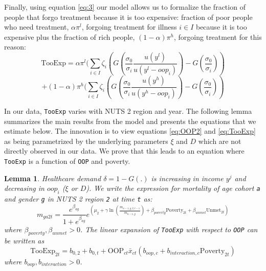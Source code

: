 \documentclass[a4paper,12pt]{article}
\newtheorem{lemma}{Lemma}
\begin{document}
Finally, using equation \eqref{eq:3} our model allows us to formalize the fraction of people that forgo treatment because it is too expensive: fraction of poor people who need treatment, \(\alpha \pi^l\), forgoing treatment for illness \(i \in I\) because it is too expensive plus the fraction of rich people, \((1-\alpha)\pi^h\), forgoing treatment for this reason:
\begin{equation}
\label{eq:TooExp}
\text{TooExp} = \alpha \pi^l (\sum_{i \in I}\zeta_{i} \left(G\left( \frac{\sigma_0}{\sigma_i} \frac{u(y^{l})}{u(y^{l}-oop_{i})} \right) - G\left( \frac{\sigma_0}{\sigma_i} \right) \right )
\end{equation}
\begin{equation*}
 + (1-\alpha) \pi^h (\sum_{i \in I}\zeta_{i} \left(G\left( \frac{\sigma_0}{\sigma_i} \frac{u(y^{h})}{u(y^{h}-oop_{i})} \right) - G\left( \frac{\sigma_0}{\sigma_i} \right) \right )
\end{equation*}

In our data, \texttt{TooExp} varies with NUTS 2 region and year. The following lemma summarizes the main results from the model and presents the equations that we estimate below. The innovation is to view equations \eqref{eq:OOP2} and \eqref{eq:TooExp} as being parametrized by the underlying parameters \(\xi\) and \(D\) which are not directly observed in our data. We prove that this leads to an equation where \texttt{TooExp} is a function of \texttt{OOP} and poverty.

\begin{lemma}
Healthcare demand \(\delta = 1-G(.)\) is increasing in income \(y^j\) and decreasing in \(oop_i\) (\(\xi\) or \(D\)). We write the expression for mortality of age cohort \texttt{a} and gender \texttt{g}  in NUTS 2 region \texttt{2} at time \texttt{t} as:
$$
m_{ga2t} = \frac{e^{\beta_{ag}}}{1+e^{\beta_{ag}}} e^{\left( \mu_2 + \gamma \ln \left(\frac{m_{a-1,g,2,t-1}}{\bar{m}_{a-1,g}}\right)+ \beta_{poverty}\text{Poverty}_{2t} + \beta_{unmet}\text{Unmet}_{2t}\right)}
$$
where \(\beta_{poverty}, \beta_{unmet} > 0\). The linear expansion of \texttt{TooExp} with respect to \texttt{OOP} can be written as
$$
\text{TooExp}_{2t} = b_{0,2} + b_{0,t} + \text{OOP}_{ct} \bar{x}_{ct} \left(  b_{oop,c} + b_{interaction,c} \text{Poverty}_{2t} \right)
$$
where \(b_{oop},b_{interaction}>0\).
\label{prop:1}
\end{lemma}
\end{document}

